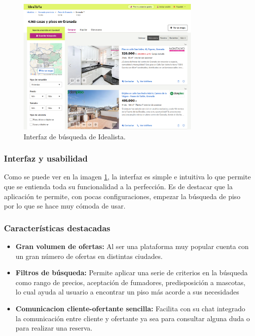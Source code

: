 \begin{figure}[H]
    \centering
    \includegraphics[width=0.8\textwidth]{fotos/idealista.png}
    \caption{Interfaz de búsqueda de Idealista\textbf{}.}
    \label{fig:idealista}
\end{figure}

\subsubsection*{Interfaz y usabilidad}
Como se puede ver en la imagen \ref{fig:idealista}, la interfaz es simple e intuitiva lo que permite que se entienda toda su funcionalidad a la perfección. Es de destacar que la aplicación te permite, con pocas configuraciones, empezar la búsqueda de piso por lo que se hace muy cómoda de usar.

\subsubsection*{Características destacadas}
\begin{itemize}
    \item \textbf{Gran volumen de ofertas:} Al ser una plataforma muy popular cuenta con un gran número de ofertas en distintas ciudades.
    \item \textbf{Filtros de búsqueda:} Permite aplicar una serie de criterios en la búsqueda como rango de precios, aceptación de fumadores, predisposición a mascotas, lo cual ayuda al usuario a encontrar un piso más acorde a sus necesidades
    \item \textbf{Comunicacion cliente-ofertante sencilla:} Facilita con su chat integrado la comunicación entre cliente y ofertante ya sea para consultar alguna duda o para realizar una reserva.
\end{itemize}
